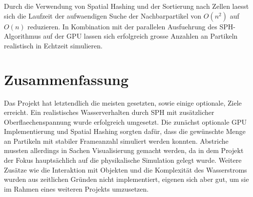 \documentclass[a4paper]{paper}
\begin{document}
Durch die Verwendung von Spatial Hashing und der Sortierung nach Zellen laesst sich die Laufzeit der aufwaendigen Suche der Nachbarpartikel von $O(n^2)$ auf $O(n)$ reduzieren.
In Kombination mit der parallelen Ausfuehrung des SPH-Algorithmus auf der GPU lassen sich erfolgreich grosse Anzahlen an Partikeln realistisch in Echtzeit simulieren.

\section{Zusammenfassung}

Das Projekt hat letztendlich die meisten gesetzten, sowie einige optionale, Ziele erreicht. Ein realistisches Wasserverhalten durch SPH mit zusätzlicher Oberflaechenspannung wurde erfolgreich umgesetzt. Die zunächst optionale GPU Implementierung und Spatial Hashing sorgten dafür, dass die gewünschte Menge an Partikeln mit stabiler Frameanzahl simuliert werden konnten. Abstriche mussten allerdings in Sachen Visualisierung gemacht werden, da in dem Projekt der Fokus hauptsächlich auf die physikalische Simulation gelegt wurde. Weitere Zusätze wie die Interaktion mit Objekten und die Komplexität des Wasserstroms wurden aus zeitlichen Gründen nicht implementiert, eigenen sich aber gut, um sie im Rahmen eines weiteren Projekts umzusetzen.

\end{document}
